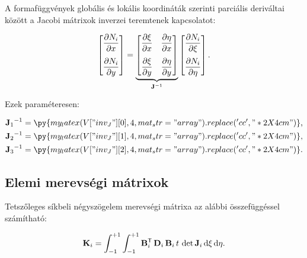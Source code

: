 A formafüggvények globális és lokális koordináták szerinti parciális deriváltai
között a Jacobi mátrixok inverzei teremtenek kapcsolatot:
\begin{myframe}
  \begin{equation}
    \begin{bmatrix}
      \displaystyle \pdv{N_i}{x} \\[4mm]
      \displaystyle \pdv{N_i}{y} \\
    \end{bmatrix}
    =
    \underbrace{
      \begin{bmatrix}
        \displaystyle \pdv{\xi}{x} &
        \displaystyle \pdv{\eta}{x}  \\[4mm]
        \displaystyle \pdv{\xi}{y} &
        \displaystyle \pdv{\eta}{y}  \\
      \end{bmatrix}
    }_{\mathbf{J}^{-1}}
    \begin{bmatrix}
      \displaystyle \pdv{N_i}{\xi}  \\[4mm]
      \displaystyle \pdv{N_i}{\eta} \\
    \end{bmatrix}
    \text.
  \end{equation}
\end{myframe}
Ezek paraméteresen:
\begin{myframe}
  \def\arraystretch{2.15}
  \begin{align}
    {\rmat J_1}^{-1} & =
    \py{my_latex(V["inv_J"][0], 4, mat_str="array").replace('cc', "*{2}{X{4cm}}")}
    \text,
    \\
    {\rmat J_2}^{-1} & =
    \py{my_latex(V["inv_J"][1], 4, mat_str="array").replace('cc', "*{2}{X{4cm}}")}
    \text,
    \\
    {\rmat J_3}^{-1} & =
    \py{my_latex(V["inv_J"][2], 4, mat_str="array").replace('cc', "*{2}{X{4cm}}")}
    \text.
  \end{align}
\end{myframe}

\subsection{Elemi merevségi mátrixok}

Tetszőleges síkbeli négyszögelem merevségi mátrixa az alábbi összefüggéssel
számítható:
\begin{myframe}
  \begin{equation}
    \mathbf{K}_i
    = \int_{-1}^{+1} \int_{-1}^{+1}
    \mathbf{B}^{\mathsf T}_i \,
    \mathbf{D}_i \,
    \mathbf{B}_i \,
    t \,
    \det \mathbf{J}_i \,
    \mathrm d \xi \,
    \mathrm d \eta
    \text.
  \end{equation}
\end{myframe}

